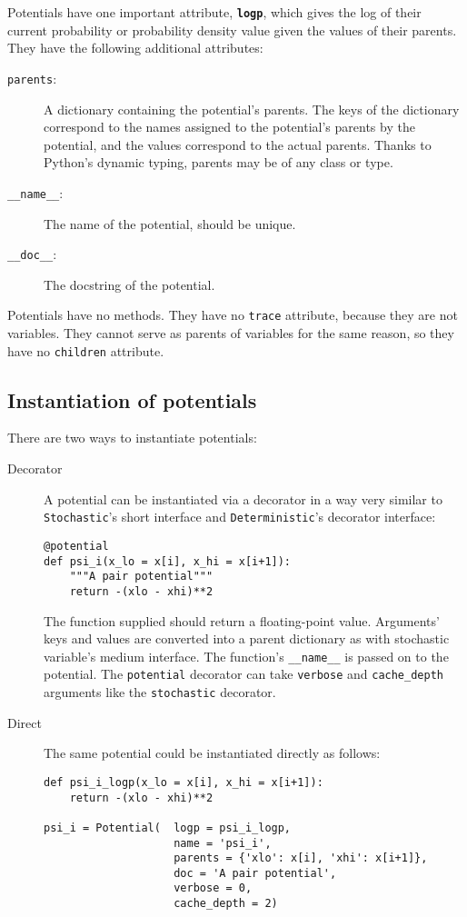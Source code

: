 \bigskip
Potentials have one important attribute, \texttt{\bfseries logp}, which gives the log of their current probability or probability density value given the values of their parents. They have the following additional attributes:
\begin{description}
    \item[\texttt{parents}:] A dictionary containing the potential's parents. The keys of the dictionary correspond to the names assigned to the potential's parents by the potential, and the values correspond to the actual parents. Thanks to Python's dynamic typing, parents may be of any class or type.
    \item[\texttt{__name__}:] The name of the potential, should be unique.
    \item[\texttt{__doc__}:] The docstring of the potential.
\end{description}
Potentials have no methods. They have no \texttt{trace} attribute, because they are not variables. They cannot serve as parents of variables for the same reason, so they have no \texttt{children} attribute.


\subsection{Instantiation of potentials}
There are two ways to instantiate potentials:
\begin{description}
    \item[Decorator] A potential can be instantiated via a decorator in a way very similar to \texttt{Stochastic}'s short interface and \texttt{Deterministic}'s decorator interface:
\begin{verbatim}
@potential
def psi_i(x_lo = x[i], x_hi = x[i+1]):
    """A pair potential"""
    return -(xlo - xhi)**2
\end{verbatim}
The function supplied should return a floating-point value. Arguments' keys and values are converted into a parent dictionary as with stochastic variable's medium interface. The function's \texttt{__name__} is passed on to the potential. The \texttt{potential} decorator can take \texttt{verbose} and \texttt{cache_depth} arguments like the \texttt{stochastic} decorator.
    \item[Direct] The same potential could be instantiated directly as follows:
\begin{verbatim}
def psi_i_logp(x_lo = x[i], x_hi = x[i+1]):
    return -(xlo - xhi)**2
        
psi_i = Potential(  logp = psi_i_logp, 
                    name = 'psi_i',
                    parents = {'xlo': x[i], 'xhi': x[i+1]},
                    doc = 'A pair potential',
                    verbose = 0,
                    cache_depth = 2)
\end{verbatim}
\end{description}

